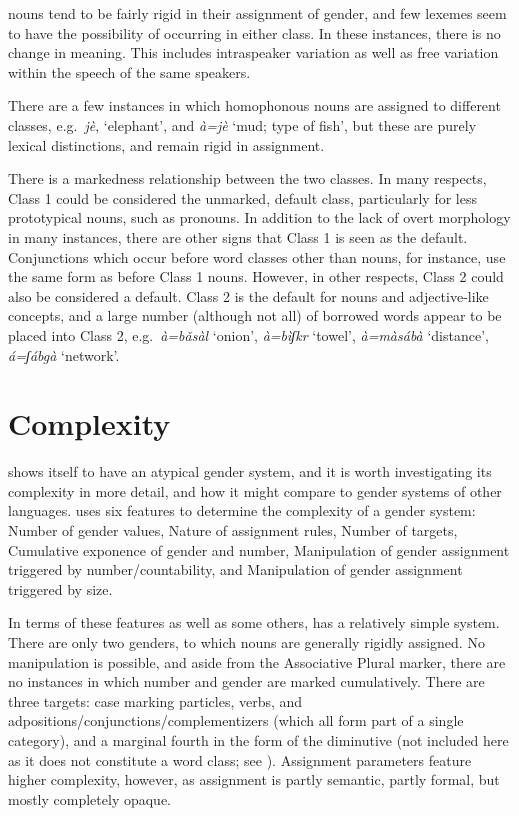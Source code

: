 \documentclass[output=collectionpaper,hidelinks]{langscibook}
\theoremstyle{remark}
\begin{document}
 nouns tend to be fairly rigid in their assignment of gender, and few
lexemes seem to have the possibility of occurring in either class. In these
instances, there is no change in meaning. This includes intraspeaker variation
as well as free variation within the speech of the same speakers.

There are a few instances in which homophonous nouns are assigned to different
classes, e.g.\ \emph{jè}, `elephant', and \emph{à=jè} `mud; type of fish',
but these are purely lexical distinctions, and remain rigid in assignment.

There is a markedness relationship between the two classes. In many respects,
Class 1 could be considered the unmarked, default class, particularly for less
prototypical nouns, such as pronouns. In addition to the lack of overt morphology in
many instances, there are other signs that Class 1 is seen as the default.
Conjunctions which occur before word classes other than nouns, for instance, use
the same form as before Class 1 nouns.
However, in other respects, Class 2 could also be considered a default.  Class 2
is the default for nouns and adjective-like concepts, and a large number
(although not all) of borrowed words appear to be placed into Class 2, e.g.\
\emph{à=bǎsàl} `onion', \emph{à=bìʃk\iLowMid{}\hspace*{-0.6mm}r} `towel',
\emph{à=màsábà} `distance', \emph{á=ʃáb\aLowMid{}\hspace*{-.4mm}gà}
`network'.

\section{Complexity}
\label{sec:Complexity}

 shows itself to have an atypical gender system, and it is worth
investigating its complexity in more detail, and how it might compare to gender systems of other languages.
\citet[183]{DiGarbo2014} uses six features to determine the
complexity of a gender system: Number of gender values, Nature of assignment
rules, Number of targets, Cumulative exponence of gender and number,
Manipulation of gender assignment triggered by number/countability, and
Manipulation of gender assignment triggered by size.

In terms of these features as well as some others,  has a relatively
simple system. There are only two genders, to which nouns are generally rigidly
assigned. No manipulation is possible, and aside from the Associative Plural
marker, there are no instances in which number and gender are marked
cumulatively. There are three targets: case marking particles, verbs, and
adpositions\slash conjunctions\slash complementizers (which all form part of a single
category), and a marginal fourth in the form of the diminutive (not included
here as it does not constitute a word class; see ). Assignment parameters feature
higher complexity, however, as assignment is partly semantic, partly formal, but mostly completely opaque.
\end{document}
